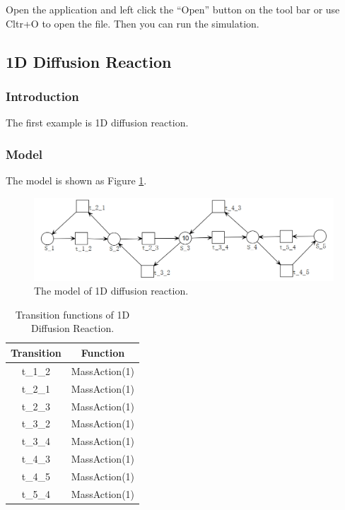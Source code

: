 \documentclass[journal,a4paper,onecolumn]{article}
\begin{document}
Open the application and left click the ``Open'' button on the tool bar or use Cltr+O to open the file. Then you can run the simulation.
\subsection{1D Diffusion Reaction}
\subsubsection{Introduction}
The first example is 1D diffusion reaction.
\subsubsection{Model}
The model is shown as Figure \ref{fig:The model of 1D diffusion reaction}.
\begin{figure}[!hbt]
	\begin{center}
		\includegraphics[width=\columnwidth]{fig20}
		\caption{The model of 1D diffusion reaction.}
		\label{fig:The model of 1D diffusion reaction}
	\end{center}
\end{figure}
\begin{table}[!hbt]
	\begin{center}
		\caption{Transition functions of 1D Diffusion Reaction.}
		\label{Transition functions of 1D Diffusion Reaction}
		\begin{tabular}{|c|c|}
			\hline
			Transition&Function\\
			\hline
			t\_1\_2&MassAction(1)\\
			\hline
						t\_2\_1&MassAction(1)\\
			\hline
						t\_2\_3&MassAction(1)\\
			\hline
						t\_3\_2&MassAction(1)\\
			\hline
						t\_3\_4&MassAction(1)\\
			\hline
						t\_4\_3&MassAction(1)\\
			\hline
						t\_4\_5&MassAction(1)\\
			\hline
						t\_5\_4&MassAction(1)\\
			\hline
		\end{tabular}
	\end{center}
\end{table}
\end{document}
